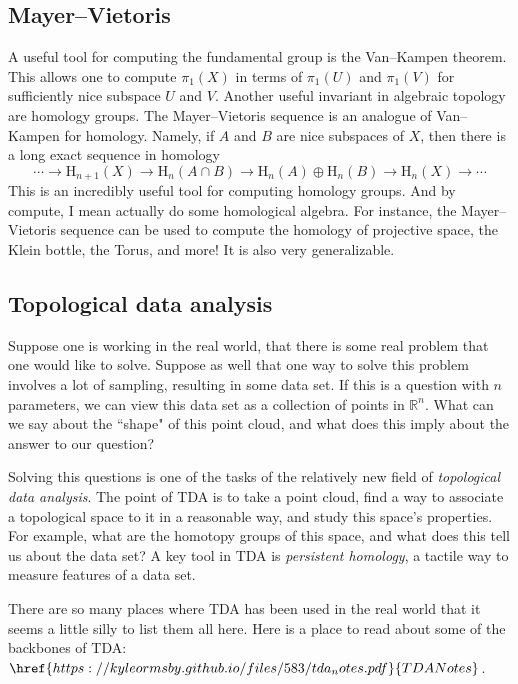 \documentclass[10pt]{amsart}
\theoremstyle{definition}
\newcommand{\cdef}[1]{\textcolor{Bittersweet}{#1}}
\begin{document}
\subsection*{Mayer--Vietoris}
A useful tool for computing the fundamental group is the Van--Kampen theorem. This allows one to compute $\pi_1(X)$ in terms of $\pi_1(U)$ and $\pi_1(V)$ for sufficiently nice subspace $U$ and $V$. Another useful invariant in algebraic topology are homology groups. The Mayer--Vietoris sequence is an analogue of Van--Kampen for homology. Namely, if $A$ and $B$ are nice subspaces of $X$, then there is a long exact sequence in homology
\[
\cdots \to \text{H}_{n+1}(X) \to \text{H}_{n}(A \cap B) \to \text{H}_n(A) \oplus \text{H}_n(B) \to \text{H}_n(X) \to \cdots
\]
This is an incredibly useful tool for computing homology groups. And by compute, I mean actually do some homological algebra. For instance, the Mayer--Vietoris sequence can be used to compute the homology of projective space, the Klein bottle, the Torus, and more! It is also very generalizable.

\subsection*{Topological data analysis}
Suppose one is working in the real world, that there is some real problem that one would like to solve. Suppose as well that one way to solve this problem involves a lot of sampling, resulting in some data set. If this is a question with $n$ parameters, we can view this data set as a collection of points in $\mathbb{R}^n$. What can we say about the ``shape" of this point cloud, and what does this imply about the answer to our question? 

Solving this questions is one of the tasks of the relatively new field of \cdef{\emph{topological data analysis}}. The point of TDA is to take a point cloud, find a way to associate a topological space to it in a reasonable way, and study this space's properties. For example, what are the homotopy groups of this space, and what does this tell us about the data set? A key tool in TDA is \cdef{\emph{persistent homology}}, a tactile way to measure features of a data set.

There are so many places where TDA has been used in the real world that it seems a little silly to list them all here. Here is a place to read about some of the backbones of TDA: $\href{https://kyleormsby.github.io/files/583/tda_notes.pdf}{TDANotes}$.
\end{document}
